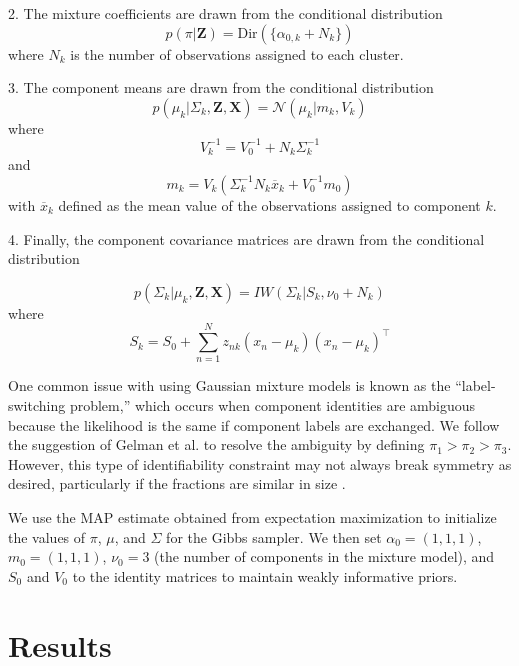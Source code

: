 \documentclass[twoside]{article}
\theoremstyle{theorem}
\theoremstyle{theorem}
\theoremstyle{theorem}
\theoremstyle{lemma}
\theoremstyle{definition}
\theoremstyle{example}
\begin{document}
2. The mixture coefficients are drawn from the conditional distribution 
\begin{equation}
p(\pi|\mathbf{Z}) = \mathrm{Dir}(\{\alpha_{0,k}+ N_k\} )
\end{equation}
where $N_k$ is the number of observations assigned to each cluster. 

3. The component means are drawn from the conditional distribution 
\begin{equation}
p(\mu_k | \Sigma_k, \mathbf{Z}, \mathbf{X}) = \mathcal{N}(\mu_k | m_k, V_k)
\end{equation}
where 
\begin{equation}
V_k^{-1} = V_0^{-1} + N_k\Sigma_k^{-1}
\end{equation}
and 
\begin{equation}
 m_k = V_k(\Sigma_k^{-1}N_k\overline{x}_k + V_0^{-1}m_0)
 \end{equation}
 with $\overline{x}_k$  defined as the mean value of the observations assigned to component $k$. 
 
 4. Finally, the component covariance matrices are drawn from the conditional distribution 
 
 \begin{equation}
 p(\Sigma_k | \mu_k, \mathbf{Z}, \mathbf{X}) = IW(\Sigma_k | S_k, \nu_0+N_k)
 \end{equation}
 where 
 \begin{equation}
S_k = S_0 + \sum_{n=1}^N z_{nk}(x_n - \mu_k)(x_n - \mu_k)^\top
\end{equation}



One common issue with using Gaussian mixture models is known as the ``label-switching problem,'' which occurs when component identities are ambiguous because the likelihood is the same if component labels are exchanged. We follow the suggestion of Gelman et al. \cite{Gelman} to resolve the ambiguity by defining $\pi_1 > \pi_2 > \pi_3$. However, this type of identifiability constraint may not always break symmetry as desired, particularly if the fractions are similar in size \cite{Stephens}. 

We use the MAP estimate obtained from expectation maximization to initialize the values of $\pi$, $\mu$, and $\Sigma$ for the Gibbs sampler. We then set $\alpha_0 = (1,1,1)$, $m_0 = (1,1,1)$, $\nu_0 = 3$ (the number of components in the mixture model), and $S_0$ and $V_0$ to the identity matrices to maintain weakly informative priors.   

\section{Results}
\end{document}
